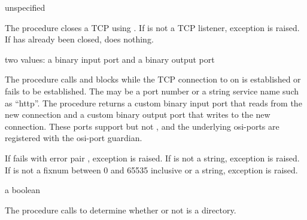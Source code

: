 \begin{procedure}
\end{procedure}
\returns{} unspecified

The  procedure closes a TCP
 using
.  If  is not a TCP
listener, exception  is raised. If  has already been
closed,  does nothing.

\begin{procedure}
\end{procedure}
\returns{} two values: a binary input port and a binary output port

The  procedure calls  and
blocks while the TCP connection to  on 
is established or fails to be established.  The  may be
a port number or a string service name such as ``http''. The procedure
returns a custom binary input port that reads from the new connection
and a custom binary output port that writes to the new
connection. These ports support  but not
, and the underlying osi-ports are registered
with the osi-port guardian.

If  fails with error pair , exception  is
raised.  If  is not a string, exception  is raised. If  is not a
fixnum between 0 and 65535 inclusive or a string, exception
 is raised.

\begin{procedure}
\end{procedure}
\returns{} a boolean

The  procedure calls  to
determine whether or not  is a directory.

